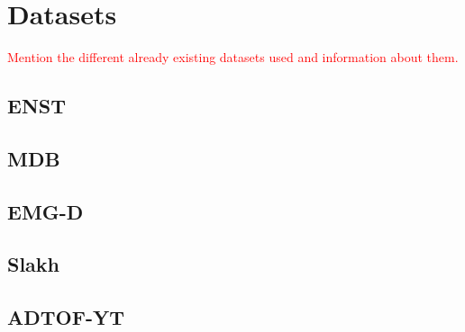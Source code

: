 \chapter{Datasets}

\textcolor{red}{Mention the different already existing datasets used and information about them.}

\section{ENST}

\section{MDB}

\section{EMG-D}

\section{Slakh}

\section{ADTOF-YT}